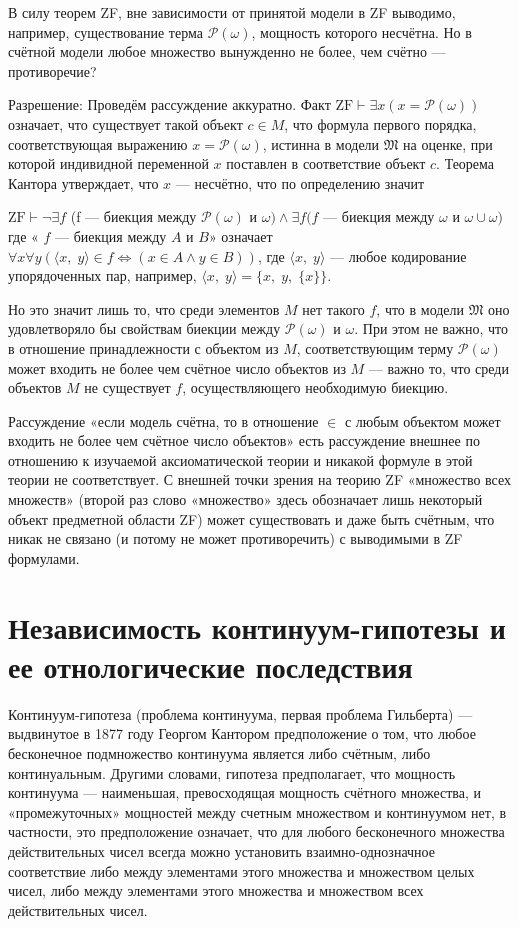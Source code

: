 \documentclass[12pt, specialist, subf, substylefile = spbu.rtx]{disser}
\begin{document}
В силу теорем ZF, вне зависимости от принятой модели в ZF выводимо, например, существование терма ${\mathcal {P}}(\omega )$, мощность которого несчётна. Но в счётной модели любое множество вынужденно не более, чем счётно — противоречие?

Разрешение: Проведём рассуждение аккуратно. Факт $\mathrm {ZF} \vdash \exists x(x={\mathcal {P}}(\omega ))$ означает, что существует такой объект $c\in M$, что формула первого порядка, соответствующая выражению $x={\mathcal {P}}(\omega )$, истинна в модели ${\mathfrak {M}}$ на оценке, при которой индивидной переменной $x$ поставлен в соответствие объект $c$. Теорема Кантора утверждает, что $x$ — несчётно, что по определению значит

$\mathrm {ZF} \vdash \neg \exists f$ (f — биекция между ${\mathcal {P}}(\omega )$ и $\omega )\land \exists f(f$ — биекция между $\omega$ и $\omega \cup {\omega })$
где « $f$ — биекция между $A$ и $B$» означает $\forall x\forall y(\langle x,\;y\rangle \in f\Leftrightarrow (x\in A\land y\in B))$, где $\langle x,\;y\rangle$ — любое кодирование упорядоченных пар, например, $\langle x,\;y\rangle =\{x,\;y,\;\{x\}\}$.

Но это значит лишь то, что среди элементов $M$ нет такого $f$, что в модели ${\mathfrak {M}}$ оно удовлетворяло бы свойствам биекции между ${\mathcal {P}}(\omega )$ и $\omega$. При этом не важно, что в отношение принадлежности с объектом из $M$, соответствующим терму ${\mathcal {P}}(\omega )$ может входить не более чем счётное число объектов из $M$ — важно то, что среди объектов $M$ не существует $f$, осуществляющего необходимую биекцию.

Рассуждение «если модель счётна, то в отношение $\in$  с любым объектом может входить не более чем счётное число объектов» есть рассуждение внешнее по отношению к изучаемой аксиоматической теории и никакой формуле в этой теории не соответствует. С внешней точки зрения на теорию ZF «множество всех множеств» (второй раз слово «множество» здесь обозначает лишь некоторый объект предметной области ZF) может существовать и даже быть счётным, что никак не связано (и потому не может противоречить) с выводимыми в ZF формулами.


\section{Независимость континуум-гипотезы и ее отнологические последствия}
Континуум-гипотеза (проблема континуума, первая проблема Гильберта) — выдвинутое в 1877 году Георгом Кантором предположение о том, что любое бесконечное подмножество континуума является либо счётным, либо континуальным. Другими словами, гипотеза предполагает, что мощность континуума — наименьшая, превосходящая мощность счётного множества, и «промежуточных» мощностей между счетным множеством и континуумом нет, в частности, это предположение означает, что для любого бесконечного множества действительных чисел всегда можно установить взаимно-однозначное соответствие либо между элементами этого множества и множеством целых чисел, либо между элементами этого множества и множеством всех действительных чисел.
\end{document}
